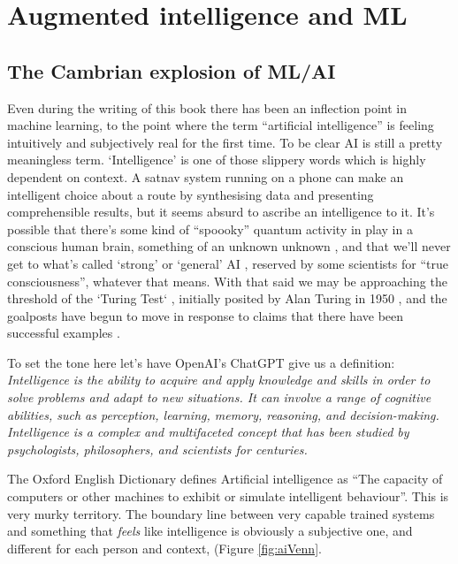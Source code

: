 \section{Augmented intelligence and ML}
\subsection{The Cambrian explosion of ML/AI}
Even during the writing of this book there has been an inflection point in machine learning, to the point where the term ``artificial intelligence'' is feeling intuitively and subjectively real for the first time.  To be clear AI is still a pretty meaningless term. `Intelligence' is one of those slippery words which is highly dependent on context. A satnav system running on a phone can make an intelligent choice about a route by synthesising data and presenting comprehensible results, but it seems absurd to ascribe an intelligence to it. It's possible that there's some kind of ``spoooky'' quantum activity in play in a conscious human brain, something of an unknown unknown \cite{kerskens2022experimental}, and that we'll never get to what's called `strong' or `general' AI \cite{larson2021myth, searle1980minds}, reserved by some scientists for ``true consciousness'', whatever that means. With that said we may be approaching the threshold of the `Turing Test` \cite{sep-turing-test}, initially posited by Alan Turing in 1950 \cite{turing1950computing}, and the goalposts have begun to move in response to claims that there have been successful examples \cite{warwick2016can, french2012moving, french2000turing, searle2009turing}.\par
To set the tone here let's have OpenAI's ChatGPT give us a definition:
\textit{Intelligence is the ability to acquire and apply knowledge and skills in order to solve problems and adapt to new situations. It can involve a range of cognitive abilities, such as perception, learning, memory, reasoning, and decision-making. Intelligence is a complex and multifaceted concept that has been studied by psychologists, philosophers, and scientists for centuries.}\par
The Oxford English Dictionary defines Artificial intelligence as ``The capacity of computers or other machines to exhibit or simulate intelligent behaviour''. This is very murky territory. The boundary line between very capable trained systems and something that \textit{feels} like intelligence is obviously a subjective one, and different for each person and context, (Figure \ref{fig:aiVenn}.\par

